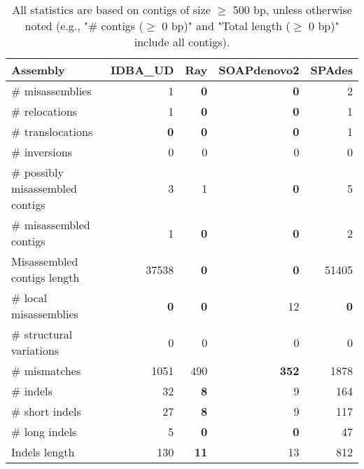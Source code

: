 \documentclass[12pt,a4paper]{article}
\begin{document}
\begin{table}[ht]
\begin{center}
\caption{All statistics are based on contigs of size $\geq$ 500 bp, unless otherwise noted (e.g., "\# contigs ($\geq$ 0 bp)" and "Total length ($\geq$ 0 bp)" include all contigs).}
\begin{tabular}{|l*{4}{|r}|}
\hline
Assembly & IDBA\_UD & Ray & SOAPdenovo2 & SPAdes \\ \hline
\# misassemblies & 1 & {\bf 0} & {\bf 0} & 2 \\ \hline
\hspace{5mm}\# relocations & 1 & {\bf 0} & {\bf 0} & 1 \\ \hline
\hspace{5mm}\# translocations & {\bf 0} & {\bf 0} & {\bf 0} & 1 \\ \hline
\hspace{5mm}\# inversions & 0 & 0 & 0 & 0 \\ \hline
\# possibly misassembled contigs & 3 & 1 & {\bf 0} & 5 \\ \hline
\# misassembled contigs & 1 & {\bf 0} & {\bf 0} & 2 \\ \hline
Misassembled contigs length & 37538 & {\bf 0} & {\bf 0} & 51405 \\ \hline
\# local misassemblies & {\bf 0} & {\bf 0} & 12 & {\bf 0} \\ \hline
\# structural variations & 0 & 0 & 0 & 0 \\ \hline
\# mismatches & 1051 & 490 & {\bf 352} & 1878 \\ \hline
\# indels & 32 & {\bf 8} & 9 & 164 \\ \hline
\hspace{5mm}\# short indels & 27 & {\bf 8} & 9 & 117 \\ \hline
\hspace{5mm}\# long indels & 5 & {\bf 0} & {\bf 0} & 47 \\ \hline
Indels length & 130 & {\bf 11} & 13 & 812 \\ \hline
\end{tabular}
\end{center}
\end{table}
\end{document}
